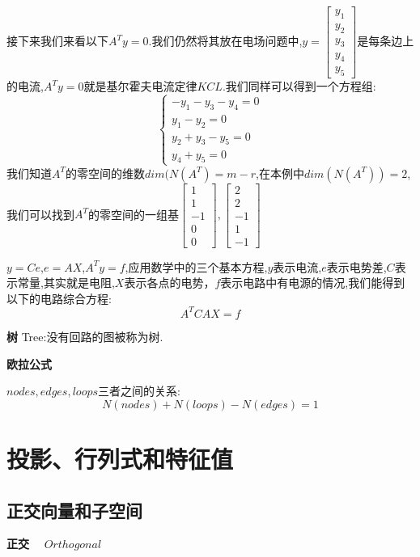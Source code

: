 \documentclass[oneside]{book}
\begin{document}
接下来我们来看以下$A^{T}y=0$.我们仍然将其放在电场问题中,$y=\left[\begin{array}{c}
	y_{1}\\y_{2}\\y_{3}\\y_{4}\\y_{5}
\end{array}\right]$是每条边上的电流,$A^{T}y=0$就是基尔霍夫电流定律$KCL$.我们同样可以得到一个方程组:
$$\left\{\begin{array}{c}
	-y_{1}-y_{3}-y_{4}=0\\y_{1}-y_{2}=0\\y_{2}+y_{3}-y_{5}=0\\y_{4}+y_{5}=0
\end{array}\right.$$我们知道$A^{T}$的零空间的维数$dim(N(A^{T})=m-r$,在本例中$dim(N(A^{T}))=2$,我们可以找到$A^{T}$的零空间的一组基$\left[\begin{array}{c}
1\\1\\-1\\0\\0
\end{array}\right],\left[\begin{array}{c}
2\\2\\-1\\1\\-1
\end{array}\right]$


$y=Ce$,$e=AX$,$A^{T}y=f$,应用数学中的三个基本方程,$y$表示电流,$e$表示电势差,$C$表示常量,其实就是电阻,$X$表示各点的电势，$f$表示电路中有电源的情况,我们能得到以下的电路综合方程:
\begin{equation}
	A^{T}CAX=f
\end{equation}

\textbf{树}
Tree:没有回路的图被称为树.

\textbf{欧拉公式}

${nodes,edges,loops}$三者之间的关系:
\begin{equation}
	N(nodes)+N(loops)-N(edges)=1
\end{equation}
	\part{投影、行列式和特征值}
	\chapter{正交向量和子空间}
	\textbf{正交} $\quad Orthogonal$
	
\end{document}
